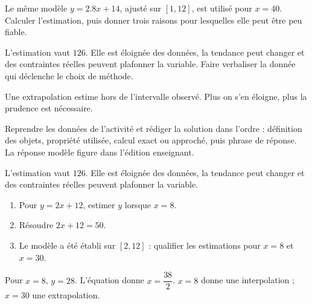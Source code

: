 \begin{activity}
Le même modèle $y=\num{2,8}x+14$, ajusté sur $[1,12]$, est utilisé pour $x=40$. Calculer l'estimation, puis donner trois raisons pour lesquelles elle peut être peu fiable.
\begin{center}\end{center}
\end{activity}
\begin{solution}L'estimation vaut $126$. Elle est éloignée des données, la tendance peut changer et des contraintes réelles peuvent plafonner la variable. Faire verbaliser la donnée qui déclenche le choix de méthode.\end{solution}

\begin{summary}Une extrapolation estime hors de l'intervalle observé. Plus on s'en éloigne, plus la prudence est nécessaire.\end{summary}

\begin{example}
Reprendre les données de l'activité et rédiger la solution dans l'ordre : définition des objets, propriété utilisée, calcul exact ou approché, puis phrase de réponse. La réponse modèle figure dans l'édition enseignant.
\end{example}
\begin{solution}L'estimation vaut $126$. Elle est éloignée des données, la tendance peut changer et des contraintes réelles peuvent plafonner la variable.\end{solution}

\begin{exercise}[essentiel]
\begin{enumerate}\item Pour $y=2x+12$, estimer $y$ lorsque $x=8$.\item Résoudre $2x+12=50$.\item Le modèle a été établi sur $[2,12]$ : qualifier les estimations pour $x=8$ et $x=30$.\end{enumerate}
\end{exercise}
\begin{solution}Pour $x=8$, $y=28$. L'équation donne $x=\dfrac{38}{2}$. $x=8$ donne une interpolation ; $x=30$ une extrapolation.\end{solution}

